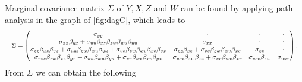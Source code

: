 \documentclass[11pt,a4paper,twoside]{article}
\newcommand{\+}[1]{\ensuremath{\mathbf{#1}}}
\begin{document}
	Marginal covariance matrix $\Sigma$ of $Y, X, Z$ and $W$ can be found by applying path analysis in the graph of \autoref{fig:dagC}, which leads to
	\[
	\resizebox{1.0\hsize}{!}{$
		\Sigma = \begin{pmatrix}
		\sigma_{yy} & \cdot & \cdot & \cdot \\
		\sigma_{xx}\beta_{yx} + \sigma_{uu}\beta_{xz}\beta_{zw}\beta_{wu}\beta_{yu} & \sigma_{xx} & \cdot & \cdot \\
		\sigma_{zz}\beta_{xz}\beta_{yx} + \sigma_{uu}\beta_{zw}\beta_{wu}\beta_{yu} + \sigma_{vv}\beta_{zw}\beta_{wv}\beta_{xv}\beta_{yx} &
		\sigma_{zz}\beta_{xz} + \sigma_{vv}\beta_{zw}\beta_{wv}\beta_{xv} &
		\sigma_{zz} & \cdot \\
		\sigma_{ww}\beta_{zw}\beta_{xz}\beta_{yx} + \sigma_{uu}\beta_{wu}\beta_{yu} + \sigma_{vv}\beta_{wv}\beta_{xv}\beta_{yx} &
		\sigma_{ww}\beta_{zw}\beta_{xz} + \sigma_{vv}\beta_{wv}\beta_{xv} &
		\sigma_{ww}\beta_{zw} & \sigma_{ww}
		\end{pmatrix}.$}
	\]
	From $\Sigma$ we can obtain the following
\end{document}
